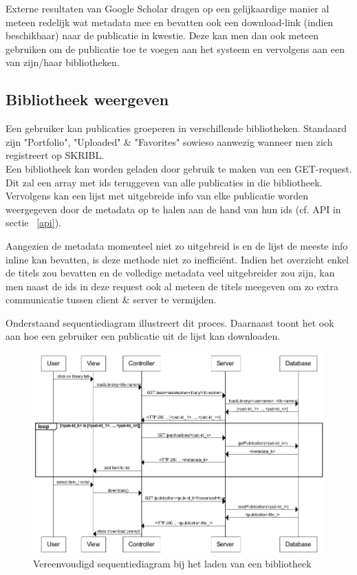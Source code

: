 \documentclass{article}
\begin{document}
Externe resultaten van Google Scholar dragen op een gelijkaardige manier al meteen redelijk wat metadata mee en bevatten ook een download-link (indien beschikbaar) naar de publicatie in kwestie. Deze kan men dan ook meteen gebruiken om de publicatie toe te voegen aan het systeem en vervolgens aan een van zijn/haar bibliotheken.

\subsection{Bibliotheek weergeven}

Een gebruiker kan publicaties groeperen in verschillende bibliotheken. Standaard zijn "Portfolio", "Uploaded" \& "Favorites" sowieso aanwezig wanneer men zich registreert op SKRIBL. \\

Een bibliotheek kan worden geladen door gebruik te maken van een GET-request. Dit zal een array met ids teruggeven van alle publicaties in die bibliotheek. Vervolgens kan een lijst met uitgebreide info van elke publicatie worden weergegeven door de metadata op te halen aan de hand van hun ids (cf. API in sectie ~\ref{api}).

Aangezien de metadata momenteel niet zo uitgebreid is en de lijst de meeste info inline kan bevatten, is deze methode niet zo ineffici\"ent. Indien het overzicht enkel de titels zou bevatten en de volledige metadata veel uitgebreider zou zijn, kan men naast de ids in deze request ook al meteen de titels meegeven om zo extra communicatie tussen client \& server te vermijden. \

Onderstaand sequentiediagram illustreert dit proces. Daarnaast toont het ook aan hoe een gebruiker een publicatie uit de lijst kan downloaden.

\begin{figure}[!h]
\centering
 \includegraphics[width=142mm]{library-sequence.png}
 \caption{Vereenvoudigd sequentiediagram bij het laden van een bibliotheek}
 \label{library-sequence}
\end{figure}
\end{document}
